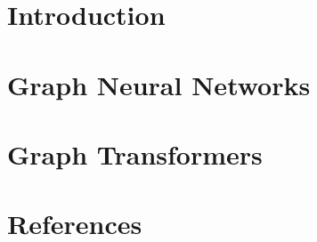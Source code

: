 \section[Intro]{Introduction}


\section[GNN]{Graph Neural Networks}


\section[GT]{Graph Transformers}


\section[Refs]{References}
